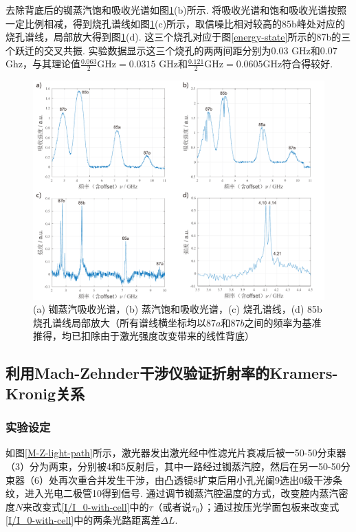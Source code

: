 \documentclass[a4paper, 10pt]{article}
\begin{document}
\begin{multicols*}{2}
去除背底后的铷蒸汽饱和吸收光谱如图\ref{saturated-absorption-exp}(b)所示. 将吸收光谱和饱和吸收光谱按照一定比例相减，得到烧孔谱线如图\ref{saturated-absorption-exp}(c)所示，取信噪比相对较高的85b峰处对应的烧孔谱线，局部放大得到图\ref{saturated-absorption-exp}(d). 这三个烧孔对应于图\ref{energy-state}所示的87b的三个跃迁的交叉共振. 实验数据显示这三个烧孔的两两间距分别为$0.03$ GHz和$0.07$ Ghz，与其理论值$\frac{0.063}{2}\text{GHz}=0.0315$ GHz和$\frac{0.121}{2}\text{GHz}=0.0605$GHz符合得较好.

\begin{figure}[H]
    \centering
    \includegraphics[width=.9\columnwidth]{SaturatedAbsorptionSpectrum.pdf}
    \caption{(a) 铷蒸汽吸收光谱，(b) 蒸汽饱和吸收光谱，(c) 烧孔谱线，(d) 85b烧孔谱线局部放大（所有谱线横坐标均以$87a$和$87b$之间的频率为基准推得，均已扣除由于激光强度改变带来的线性背底）}
    \label{saturated-absorption-exp}
\end{figure}

\subsection{利用Mach-Zehnder干涉仪验证折射率的Kramers-Kronig关系}

\subsubsection{实验设定}

如图\ref{M-Z-light-path}所示，激光器发出激光经中性滤光片衰减后被一50-50分束器（\textcircled{\footnotesize{3}}）分为两束，分别被\textcircled{\footnotesize{4}}和\textcircled{\footnotesize{5}}反射后，其中一路经过铷蒸汽腔，然后在另一50-50分束器（\textcircled{\footnotesize{6}}）处再次重合并发生干涉，由凸透镜\textcircled{\footnotesize{8}}扩束后用小孔光阑\textcircled{\footnotesize{9}}选出$0$级干涉条纹，进入光电二极管\textcircled{\footnotesize{10}}得到信号. 通过调节铷蒸汽腔温度的方式，改变腔内蒸汽密度$N$来改变式\eqref{I/I_0-with-cell}中的$\tau$（或者说$\tau_0$）；通过按压光学面包板来改变式\eqref{I/I_0-with-cell}中的两条光路距离差$\Delta L$.


\end{multicols*}
\end{document}
